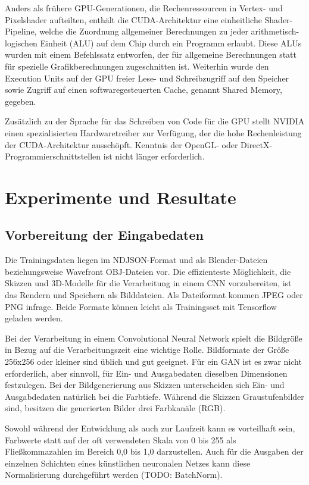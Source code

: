 Anders als frühere GPU-Generationen, die Rechenressourcen in Vertex- und Pixelshader aufteilten, enthält die CUDA-Architektur eine einheitliche Shader-Pipeline, welche die Zuordnung allgemeiner Berechnungen zu jeder arithmetisch-logischen Einheit (ALU) auf dem Chip durch ein Programm erlaubt. Diese ALUs wurden mit einem Befehlssatz entworfen, der für allgemeine Berechnungen statt für spezielle Grafikberechnungen zugeschnitten ist. Weiterhin wurde den Execution Units auf der GPU freier Lese- und Schreibzugriff auf den Speicher sowie Zugriff auf einen softwaregesteuerten Cache, genannt Shared Memory, gegeben. \cite{sanders2010cuda}

Zusätzlich zu der Sprache für das Schreiben von Code für die GPU stellt NVIDIA einen spezialisierten Hardwaretreiber zur Verfügung, der die hohe Rechenleistung der CUDA-Architektur ausschöpft. Kenntnis der OpenGL- oder DirectX-Programmierschnittstellen ist nicht länger erforderlich. \cite{sanders2010cuda}


\chapter{Experimente und Resultate}
\label{ch:conduct}

\section{Vorbereitung der Eingabedaten}
\label{sec:preparation}
Die Trainingsdaten liegen im NDJSON-Format und als Blender-Dateien beziehungsweise
Wavefront OBJ-Dateien vor. Die effizienteste Möglichkeit, die Skizzen und 3D-Modelle für die Verarbeitung in einem CNN vorzubereiten, ist das Rendern und  Speichern als Bilddateien. Als Dateiformat kommen JPEG oder PNG infrage. Beide Formate können leicht als Trainingsset mit Tensorflow geladen werden.

Bei der Verarbeitung in einem Convolutional Neural Network spielt die Bildgröße
in Bezug auf die Verarbeitungszeit eine wichtige Rolle. Bildformate der Größe 256x256 oder kleiner sind üblich und gut geeignet. Für ein GAN ist es zwar nicht erforderlich, aber sinnvoll, für Ein- und Ausgabedaten dieselben Dimensionen festzulegen. Bei der Bildgenerierung aus Skizzen unterscheiden sich Ein- und Ausgabdedaten natürlich bei die Farbtiefe. Während die Skizzen Graustufenbilder sind, besitzen die generierten Bilder drei Farbkanäle (RGB).

Sowohl während der Entwicklung als auch zur Laufzeit kann es vorteilhaft sein, Farbwerte statt auf der oft verwendeten Skala von 0 bis 255 als Fließkommazahlen im Bereich 0,0 bis 1,0 darzustellen. Auch für die Ausgaben der einzelnen Schichten eines künstlichen neuronalen Netzes kann diese Normalisierung durchgeführt werden (TODO: BatchNorm).

